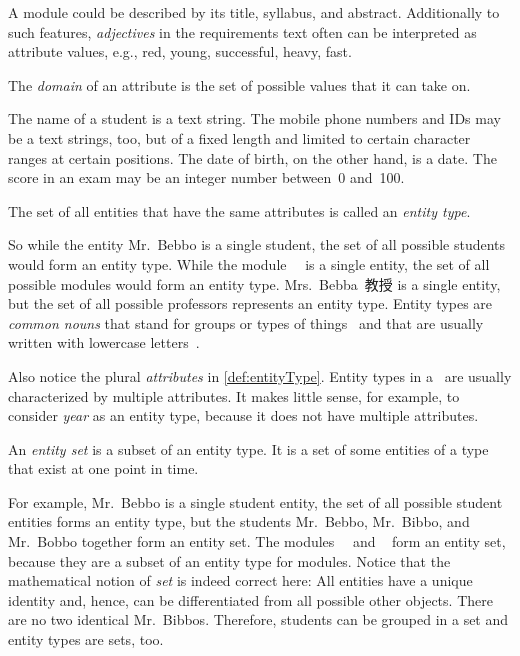 A module could be described by its title, syllabus, and abstract.
Additionally to such features, \emph{adjectives} in the requirements text often can be interpreted as attribute values, e.g., red, young, successful, heavy, fast.%
%
\begin{definition}[Domain]%
The \emph{domain} of an attribute is the set of possible values that it can take on.%
\end{definition}%
%
The name of a student is a text string.
The mobile phone numbers and IDs may be a text strings, too, but of a fixed length and limited to certain character ranges at certain positions.
The date of birth, on the other hand, is a date.
The score in an exam may be an integer number between~0 and~100.%
%
\begin{definition}%
\label{def:entityType}%
The set of all entities that have the same attributes is called an \emph{entity type}.%
\end{definition}%
%
So while the entity Mr.~Bebbo is a single student, the set of all possible students would form an entity type.
While the module~~\cite{programmingWithPython} is a single entity, the set of all possible modules would form an entity type.
Mrs.~Bebba~教授 is a single entity, but the set of all possible professors represents an entity type.
Entity types are \emph{common nouns} that stand for groups or types of things~\cite{S2024D:CDMERDE} and that are usually written with lowercase letters~\cite{EOWM2025MWAMTD:CAPNWTDLWOGC}.

Also notice the plural \emph{attributes} in \cref{def:entityType}.
Entity types in a \db\ are usually characterized by multiple attributes.
It makes little sense, for example, to consider \emph{year} as an entity type, because it does not have multiple attributes.%
%
\begin{definition}%
An \emph{entity set} is a subset of an entity type. %
It is a set of some entities of a type that exist at one point in time.%
\end{definition}%
%
For example, Mr.~Bebbo is a single student entity, the set of all possible student entities forms an entity type, but the students Mr.~Bebbo, Mr.~Bibbo, and Mr.~Bobbo together form an entity set.
The modules~~\cite{programmingWithPython} and ~\cite{databases} form an entity set, because they are a subset of an entity type for modules.
Notice that the mathematical notion of \emph{set} is indeed correct here:
All entities have a unique identity and, hence, can be differentiated from all possible other objects.
There are no two identical Mr.~Bibbos.
Therefore, students can be grouped in a set and entity types are sets, too.

